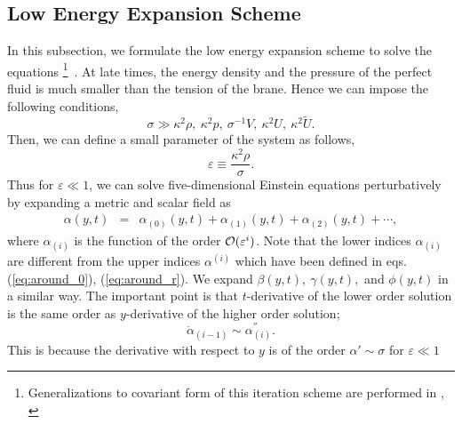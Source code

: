 \documentclass[a4paper,11pt]{article}
\begin{document}
\subsection{Low Energy Expansion Scheme}

In this subsection, we formulate the low energy expansion scheme to 
solve the equations \footnote{
Generalizations to covariant form of this iteration scheme 
are performed in \cite{Kanno1}, \cite{Kanno2}}\ . 
At late times, the energy density and 
the pressure of the perfect fluid is much smaller than the 
tension of the brane. Hence we can impose the following conditions,    
\begin{equation}
\sigma \gg \kappa^2 \rho,\ \kappa^2 p,\ \sigma^{-1} V,\ 
\kappa^2 U,\ \kappa^2 \tilde{U}.
\end{equation}
Then, we can define a small parameter of the system as follows,  
\begin{equation}
\varepsilon \equiv \frac{\kappa^2 \rho}{\sigma}. 
\end{equation}
Thus for $\varepsilon \ll 1$, we can solve five-dimensional Einstein 
equations perturbatively by expanding a metric and scalar field as  
\begin{eqnarray}
\alpha(y,t) &=& \alpha_{(0)}(y,t)+ \alpha_{(1)}(y,t) 
+ \alpha_{(2)}(y,t) +\cdots ,
\label{eq:expansion}
\end{eqnarray}
where $\alpha_{(i)}$ is the function of the order ${\cal O} (\varepsilon^i)$.
Note that the lower indices $\alpha_{(i)}$ are different from the upper 
indices $\alpha^{(i)}$ which have been defined in eqs.(\ref{eq:around_0}),
(\ref{eq:around_r}). 
We expand $\beta(y,t),\ \gamma(y,t),$ and $\phi(y,t)$ in a similar
way. The important point is that $t$-derivative of the lower
order solution is the same order as $y$-derivative of the higher
order solution;
\begin{equation}
\ddot{\alpha}_{(i-1)} \sim \alpha^{''}_{(i)}.
\end{equation}
This is because the derivative 
with respect to $y$
is of the order $\alpha' \sim \sigma$ for $\varepsilon \ll 1$ 
\end{document}
